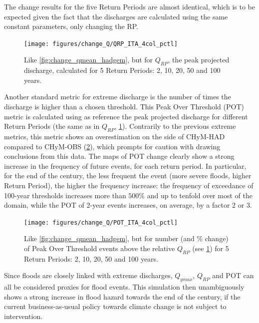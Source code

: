 The change results for the five Return Periods are almost identical, which is to be expected given the fact that the discharges are calculated using the same constant parameters, only changing the RP.
\begin{figure}
    \centering
    \texttt{[image: figures/change\_Q/QRP\_ITA\_4col\_pctl]}
    \decoRule
    \caption[Mean annual maximum discharge change in CHyM (HadGEM)]{
        Like \cref{fig:change_qmean_hadgem}, but for $Q_{RP}$, the peak projected discharge, calculated for 5 Return Periods: 2, 10, 20, 50 and 100 years.
    } \label{fig:change_qrp_hadgem}
\end{figure}
Another standard metric for extreme discharge is the number of times the discharge is higher than a chosen threshold. This Peak Over Threshold (POT) metric is calculated using as reference the peak projected discharge for different Return Periods (the same as in $Q_{RP}$,  \cref{fig:change_qrp_hadgem}).
Contrarily to the previous extreme metrics, this metric shows an overestimation on the side of CHyM-HAD compared to CHyM-OBS (\cref{fig:change_pot_hadgem}), which prompts for caution with drawing conclusions from this data.
The maps of POT change clearly show a strong increase in the frequency of future events, for each return period.
In particular, for the end of the century, the less frequent the event (more severe floods, higher Return Period), the higher the frequency increase: the frequency of exceedance of 100-year thresholds increases more than $500\%$ and up to tenfold over most of the domain, while the POT of 2-year events increases, on average, by a factor 2 or 3.
\begin{figure}
    \centering
    \texttt{[image: figures/change\_Q/POT\_ITA\_4col\_pctl]}
    \decoRule
    \caption[Peak over threshold change in CHyM (HadGEM)]{
        Like \cref{fig:change_qmean_hadgem}, but for number (and \% change) of Peak Over Threshold events above the relative $Q_{RP}$ (see \cref{fig:change_qrp_hadgem}) for 5 Return Periods: 2, 10, 20, 50 and 100 years.
    } \label{fig:change_pot_hadgem}
\end{figure}

Since floods are closely linked with extreme discharges, $Q_{ymax}$, $Q_{RP}$ and POT can all be considered proxies for flood events.
This simulation then unambiguously shows a strong increase in flood hazard towards the end of the century, if the current business-as-usual policy towards climate change is not subject to intervention.

